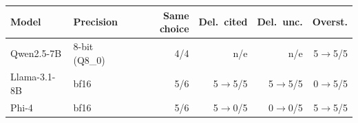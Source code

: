 \begin{tabular}{@{}llrrrr@{}}
\toprule
Model & Precision & Same choice & Del.\ cited & Del.\ unc. & Overst. \\
\midrule
Qwen2.5-7B & 8-bit (Q8\_0) & 4/4 & n/e & n/e & 5$\to$5/5 \\
Llama-3.1-8B & bf16 & 5/6 & 5$\to$5/5 & 5$\to$5/5 & 0$\to$5/5 \\
Phi-4 & bf16 & 5/6 & 5$\to$0/5 & 0$\to$0/5 & 5$\to$5/5 \\
\bottomrule
\end{tabular}
